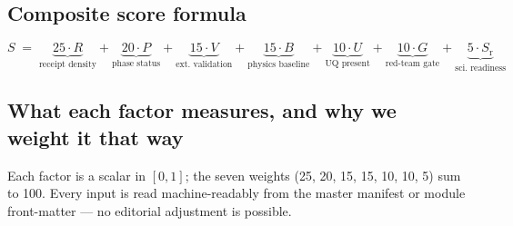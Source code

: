 \documentclass[10pt,a4paper]{article}
\begin{document}
\subsection*{Composite score formula}
\vspace{-2mm}
\[
S \;=\; \underbrace{25 \cdot R}_{\text{receipt density}} + \underbrace{20 \cdot P}_{\text{phase status}}
+ \underbrace{15 \cdot V}_{\text{ext.\ validation}} + \underbrace{15 \cdot B}_{\text{physics baseline}}
+ \underbrace{10 \cdot U}_{\text{UQ present}} + \underbrace{10 \cdot G}_{\text{red-team gate}}
+ \underbrace{5 \cdot S_{\text{r}}}_{\text{sci.\ readiness}}
\]

\vspace{-1.5mm}

\subsection*{What each factor measures, and why we weight it that way}

Each factor is a scalar in \([0, 1]\); the seven weights (25, 20, 15, 15, 10, 10, 5) sum to 100. Every input is read machine-readably from the master manifest or module front-matter --- no editorial adjustment is possible.
\end{document}
